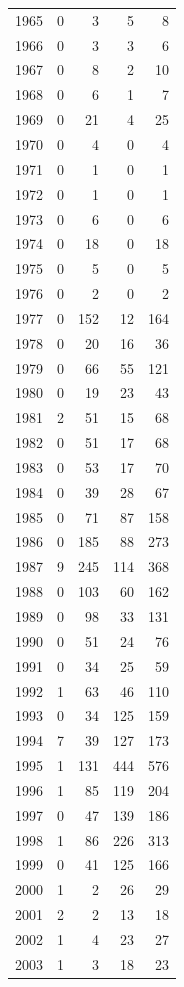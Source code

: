 \documentclass[
  english,
]{article}
\begin{document}
\begin{longtable}{rrrrr}
1965 & 0 & 3 & 5 & 8 \\ 
1966 & 0 & 3 & 3 & 6 \\ 
1967 & 0 & 8 & 2 & 10 \\ 
1968 & 0 & 6 & 1 & 7 \\ 
1969 & 0 & 21 & 4 & 25 \\ 
1970 & 0 & 4 & 0 & 4 \\ 
1971 & 0 & 1 & 0 & 1 \\ 
1972 & 0 & 1 & 0 & 1 \\ 
1973 & 0 & 6 & 0 & 6 \\ 
1974 & 0 & 18 & 0 & 18 \\ 
1975 & 0 & 5 & 0 & 5 \\ 
1976 & 0 & 2 & 0 & 2 \\ 
1977 & 0 & 152 & 12 & 164 \\ 
1978 & 0 & 20 & 16 & 36 \\ 
1979 & 0 & 66 & 55 & 121 \\ 
1980 & 0 & 19 & 23 & 43 \\ 
1981 & 2 & 51 & 15 & 68 \\ 
1982 & 0 & 51 & 17 & 68 \\ 
1983 & 0 & 53 & 17 & 70 \\ 
1984 & 0 & 39 & 28 & 67 \\ 
1985 & 0 & 71 & 87 & 158 \\ 
1986 & 0 & 185 & 88 & 273 \\ 
1987 & 9 & 245 & 114 & 368 \\ 
1988 & 0 & 103 & 60 & 162 \\ 
1989 & 0 & 98 & 33 & 131 \\ 
1990 & 0 & 51 & 24 & 76 \\ 
1991 & 0 & 34 & 25 & 59 \\ 
1992 & 1 & 63 & 46 & 110 \\ 
1993 & 0 & 34 & 125 & 159 \\ 
1994 & 7 & 39 & 127 & 173 \\ 
1995 & 1 & 131 & 444 & 576 \\ 
1996 & 1 & 85 & 119 & 204 \\ 
1997 & 0 & 47 & 139 & 186 \\ 
1998 & 1 & 86 & 226 & 313 \\ 
1999 & 0 & 41 & 125 & 166 \\ 
2000 & 1 & 2 & 26 & 29 \\ 
2001 & 2 & 2 & 13 & 18 \\ 
2002 & 1 & 4 & 23 & 27 \\ 
2003 & 1 & 3 & 18 & 23 \\ 

\end{longtable}
\end{document}
